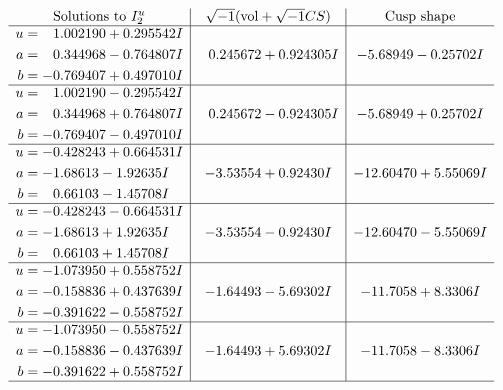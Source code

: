 \documentclass[1p]{elsarticle_modified}
\theoremstyle{definition}
\newcommand{\I}{\sqrt{-1}}
\begin{document}
$$\begin{array}{c|c|c}  
\text{Solutions to }I^u_{2}& \I (\text{vol} + \sqrt{-1}CS) & \text{Cusp shape}\\
 \hline 
\begin{aligned}
u &= \phantom{-}1.002190 + 0.295542 I \\
a &= \phantom{-}0.344968 - 0.764807 I \\
b &= -0.769407 + 0.497010 I\end{aligned}
 & \phantom{-}0.245672 + 0.924305 I & -5.68949 - 0.25702 I \\ \hline\begin{aligned}
u &= \phantom{-}1.002190 - 0.295542 I \\
a &= \phantom{-}0.344968 + 0.764807 I \\
b &= -0.769407 - 0.497010 I\end{aligned}
 & \phantom{-}0.245672 - 0.924305 I & -5.68949 + 0.25702 I \\ \hline\begin{aligned}
u &= -0.428243 + 0.664531 I \\
a &= -1.68613 - 1.92635 I \\
b &= \phantom{-}0.66103 - 1.45708 I\end{aligned}
 & -3.53554 + 0.92430 I & -12.60470 + 5.55069 I \\ \hline\begin{aligned}
u &= -0.428243 - 0.664531 I \\
a &= -1.68613 + 1.92635 I \\
b &= \phantom{-}0.66103 + 1.45708 I\end{aligned}
 & -3.53554 - 0.92430 I & -12.60470 - 5.55069 I \\ \hline\begin{aligned}
u &= -1.073950 + 0.558752 I \\
a &= -0.158836 + 0.437639 I \\
b &= -0.391622 - 0.558752 I\end{aligned}
 & -1.64493 - 5.69302 I & -11.7058 + 8.3306 I \\ \hline\begin{aligned}
u &= -1.073950 - 0.558752 I \\
a &= -0.158836 - 0.437639 I \\
b &= -0.391622 + 0.558752 I\end{aligned}
 & -1.64493 + 5.69302 I & -11.7058 - 8.3306 I\\
 \hline 
 \end{array}$$\newpage\newpage\renewcommand{\arraystretch}{1}
\end{document}
